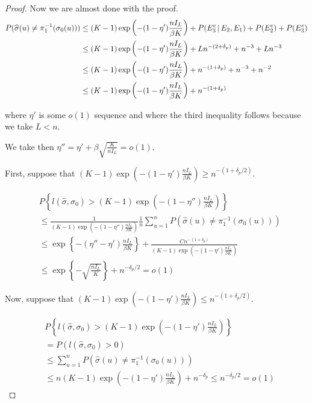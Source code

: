 \begin{proof}
Now we are almost done with the proof.  
\begin{align*}
P( \widehat{\sigma}(u) \neq \pi_1^{-1} ( \sigma_0(u)) ) &\leq (K-1) \exp\left( -(1 - \eta') \frac{n I_L}{\beta K} \right) + P(E_3^c {\,|\,} E_2, E_1) + P(E_2^c) + P(E_3^c) \\
    &\leq (K-1) \exp\left( -(1 - \eta') \frac{n I_L}{\beta K} \right) + Ln^{-(2 + \delta_p)} + n^{-3} + Ln^{-3} \\
    &\leq (K-1) \exp\left( -(1 - \eta') \frac{n I_L}{\beta K} \right) + n^{-(1 + \delta_p)} + n^{-3} + n^{-2} \\
    &\leq  (K-1) \exp\left( -(1 - \eta') \frac{n I_L}{\beta K} \right) + n^{-(1 + \delta_p)}
\end{align*}

where $\eta'$ is some $o(1)$ sequence and where the third inequality follows because we take $L < n$. 

We take then $\eta'' = \eta' + \beta \sqrt{ \frac{K}{ n I_L} } = o(1)$. 

First, suppose that $ (K-1) \exp\left( -(1 - \eta') \frac{n I_L}{\beta K} \right) \geq n^{-(1+\delta_p/2)} $. 

\begin{align*}
& P\left\{ l(\hat{\sigma}, \sigma_0) >  (K-1) \exp\left( -(1 - \eta'') \frac{n I_L}{\beta K} \right) \right\} \\
 &\leq \frac{1}{ (K-1) \exp\left( -(1 - \eta'') \frac{n I_L}{\beta K} \right) } \frac{1}{n} \sum_{u=1}^n P(\hat{\sigma}(u) \neq \pi_1^{-1}(\sigma_0(u))) \\
 &\leq \exp\left\{ -(\eta'' - \eta') \frac{n I_L}{\beta K} \right\} + \frac{ C n^{-(1 + \delta_p)} }{  (K-1) \exp\left( -(1 - \eta') \frac{n I_L}{\beta K} \right)  }\\
 &\leq \exp \left\{ - \sqrt{ \frac{n I_L}{K} } \right\} + n^{-\delta_p/2} = o(1)
\end{align*}

Now, suppose that $ (K-1) \exp\left( -(1 - \eta') \frac{n I_L}{\beta K} \right) \leq n^{-(1 + \delta_p/2)}$.

\begin{align*}
& P \left\{ l(\hat{\sigma}, \sigma_0) >  (K-1) \exp\left( -(1 - \eta') \frac{n I_L}{\beta K} \right)  \right\} \\
& = P( l(\hat{\sigma}, \sigma_0) > 0 ) \\
& \leq \sum_{u=1}^n P( \hat{\sigma}(u) \neq \pi_1^{-1}(\sigma_0(u))) \\
&\leq n  (K-1) \exp\left( -(1 - \eta') \frac{n I_L}{\beta K} \right)  + n^{-\delta_p} \leq n^{-\delta_p /2} = o(1)
\end{align*}

\end{proof}

